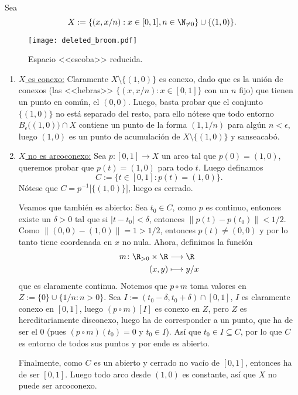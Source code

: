 \documentclass[topologia-analisis.tex]{subfiles}
\begin{document}
\begin{exn}
	Sea
	$$ X := \{ (x, x/n) : x\in[0, 1], n\in\N_{\ne 0} \} \cup \{ (1, 0) \}. $$
	\begin{figure}[!hbt]
		\centering
		\texttt{[image: deleted\_broom.pdf]}
		\caption{Espacio <<escoba>> reducida.}%
		\label{fig:deleted_broom}
	\end{figure}

	\begin{enumerate}
		\item \underline{$X$ es conexo:}
			Claramente $X \setminus \{(1, 0)\}$ es conexo, dado que es la unión de conexos (las <<hebras>> $\{(x, x/n) : x\in[0,1]\}$ con un $n$ fijo)
			que tienen un punto en común, el $(0,0)$.
			Luego, basta probar que el conjunto $\{(1, 0)\}$ no está separado del resto,
			para ello nótese que todo entorno $ B_\epsilon\big( (1, 0) \big) \cap X $ contiene un punto de la forma $(1, 1/n)$ para algún $n < \epsilon$,
			luego $(1, 0)$ es un punto de acumulación de $X \setminus \{(1, 0)\}$ y sanseacabó.

		\item \underline{$X$ no es arcoconexo:}
			Sea $p\colon [0, 1] \to X$ un arco tal que $p(0) = (1, 0)$, queremos probar que $p(t) = (1, 0)$ para todo $t$.
			Luego definamos
			$$ C := \{ t\in[0, 1] : p(t) = (1, 0) \}. $$
			Nótese que $C = p^{-1}\big[ \{(1, 0)\} \big]$, luego es cerrado.

			Veamos que también es abierto:
			Sea $t_0 \in C$, como $p$ es continuo, entonces existe un $\delta > 0$ tal que si $|t - t_0| < \delta$, entonces
			$\|p(t) - p(t_0)\| < 1/2$.
			Como $\|(0, 0) - (1, 0)\| = 1 > 1/2$, entonces $p(t) \ne (0, 0)$ y por lo tanto tiene coordenada en $x$ no nula.
			Ahora, definimos la función
			\begin{align*}
				m \colon \R_{>0}\times\R &\longrightarrow \R \\
				(x, y) &\longmapsto y/x
			\end{align*}
			que es claramente continua.
			Notemos que $p\circ m$ toma valores en $Z := \{0\}\cup\{1/n : n>0\}$.
			Sea $I := (t_0 - \delta, t_0 + \delta) \cap [0, 1]$, $I$ es claramente conexo en $[0, 1]$,
			luego $(p\circ m)[I]$ es conexo en $Z$, pero $Z$ es hereditariamente disconexo, luego ha de corresponder a un punto,
			que ha de ser el 0 (pues $(p\circ m)(t_0) = 0$ y $t_0 \in I$).
			Así que $t_0 \in I \subseteq C$, por lo que $C$ es entorno de todos sus puntos y por ende es abierto.

			Finalmente, como $C$ es un abierto y cerrado no vacío de $[0, 1]$, entonces ha de ser $[0, 1]$.
			Luego todo arco desde $(1, 0)$ es constante, así que $X$ no puede ser arcoconexo. \qedhere
	\end{enumerate}
\end{exn}
\end{document}
